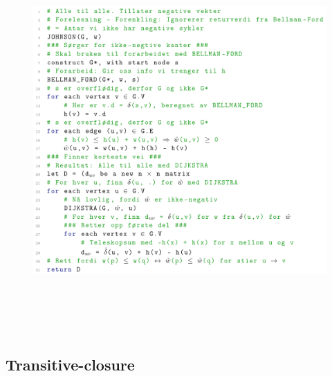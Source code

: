 \documentclass[12pt]{report}
\begin{document}
\begin{figure}[H]
	\begin{Center}
		\includegraphics[width=6.3in,height=5.75in]{./media/image200.png}
	\end{Center}
\end{figure}



\par


\vspace{\baselineskip}



\newpage

\vspace{\baselineskip}\subsection*{Transitive-closure}


\end{document}

